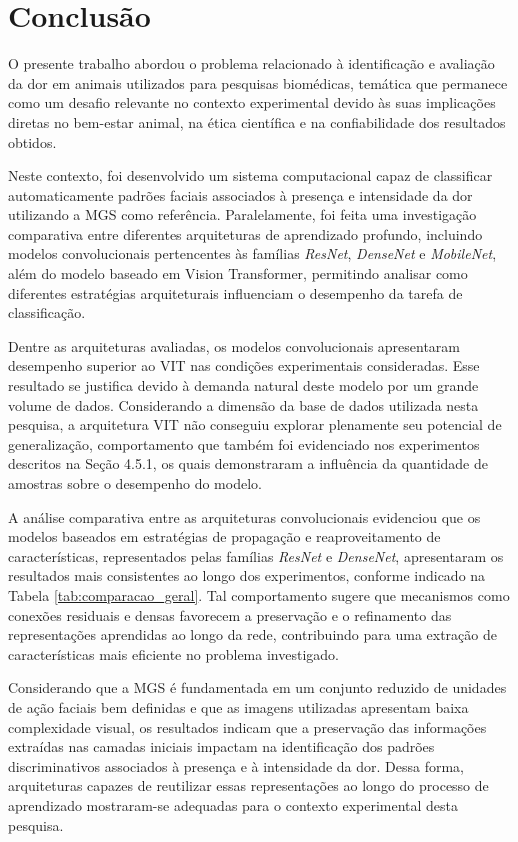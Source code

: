 \chapter[Conclusão]{Conclusão}

O presente trabalho abordou o problema relacionado à identificação e avaliação da dor em animais utilizados para pesquisas biomédicas, temática que permanece como um desafio relevante no contexto experimental devido às suas implicações diretas no bem-estar animal, na ética científica e na confiabilidade dos resultados obtidos. 

Neste contexto, foi desenvolvido um sistema computacional capaz de classificar automaticamente padrões faciais associados à presença e intensidade da dor utilizando a \acs{MGS} como referência. Paralelamente, foi feita uma investigação comparativa entre diferentes arquiteturas de aprendizado profundo, incluindo modelos convolucionais pertencentes às famílias \textit{ResNet}, \textit{DenseNet} e \textit{MobileNet}, além do modelo baseado em Vision Transformer, permitindo analisar como diferentes estratégias arquiteturais influenciam o desempenho da tarefa de classificação.

Dentre as arquiteturas avaliadas, os modelos convolucionais apresentaram desempenho superior ao \acs{VIT} nas condições experimentais consideradas. Esse resultado se justifica devido à demanda natural deste modelo por um grande volume de dados. Considerando a dimensão da base de dados utilizada nesta pesquisa, a arquitetura \acs{VIT} não conseguiu explorar plenamente seu potencial de generalização, comportamento que também foi evidenciado nos experimentos descritos na Seção 4.5.1, os quais demonstraram a influência da quantidade de amostras sobre o desempenho do modelo.

A análise comparativa entre as arquiteturas convolucionais evidenciou que os modelos baseados em estratégias de propagação e reaproveitamento de características, representados pelas famílias \textit{ResNet} e \textit{DenseNet}, apresentaram os resultados mais consistentes ao longo dos experimentos, conforme indicado na Tabela \ref{tab:comparacao_geral}. Tal comportamento sugere que mecanismos como conexões residuais e densas favorecem a preservação e o refinamento das representações aprendidas ao longo da rede, contribuindo para uma extração de características mais eficiente no problema investigado.

Considerando que a \acs{MGS} é fundamentada em um conjunto reduzido de unidades de ação faciais bem definidas e que as imagens utilizadas apresentam baixa complexidade visual, os resultados indicam que a preservação das informações extraídas nas camadas iniciais impactam  na identificação dos padrões discriminativos associados à presença e à intensidade da dor. Dessa forma, arquiteturas capazes de reutilizar essas representações ao longo do processo de aprendizado mostraram-se adequadas para o contexto experimental desta pesquisa.

